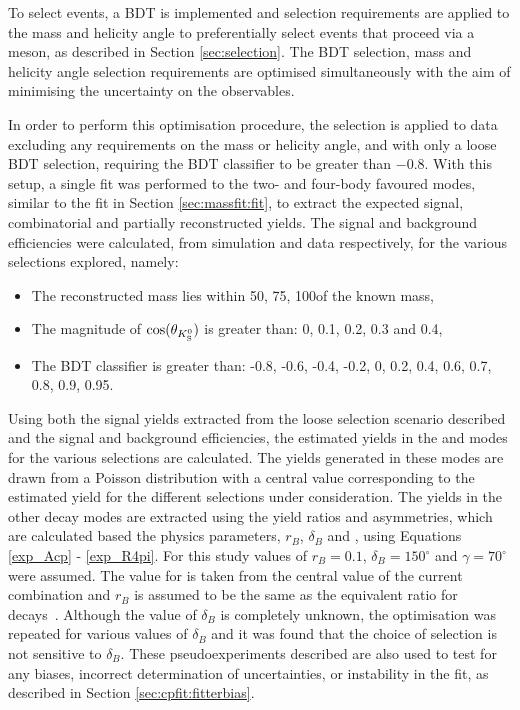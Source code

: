To select \btodkst events, a BDT is implemented and selection requirements are applied to the \Kstarm mass and \KS helicity angle to preferentially select events that proceed via a \Kstarm meson, as described in Section \ref{sec:selection}. The BDT selection, \Kstarm mass and \KS helicity angle selection requirements are optimised simultaneously with the aim of minimising the uncertainty on the \CP observables. 

In order to perform this optimisation procedure, the selection is applied to data excluding any requirements on the \Kstarm mass or \KS helicity angle, and with only a loose BDT selection, requiring the BDT classifier to be greater than $-0.8$. With this setup, a single fit was performed to the two- and four-body favoured modes, similar to the fit in Section \ref{sec:massfit:fit}, to extract the expected signal, combinatorial and partially reconstructed yields. The signal and background efficiencies were calculated, from simulation and data respectively, for the various selections explored, namely:

\begin{itemize}
\item{The reconstructed \Kstarm mass lies within 50\mevcc, 75\mevcc, 100\mevcc of the known \Kstarm mass,}
\item{The magnitude of $\cos(\theta_{{{K}^0_{\mathrm{ \scriptscriptstyle S}}}})$ is greater than: 0, 0.1, 0.2, 0.3 and 0.4,}
\item{The BDT classifier is greater than: -0.8, -0.6, -0.4, -0.2, 0, 0.2, 0.4, 0.6, 0.7, 0.8, 0.9, 0.95.}
\end{itemize}

Using both the signal yields extracted from the loose selection scenario described and the signal and background efficiencies, the estimated yields in the \kpi and \kpipipi modes for the various selections are calculated. The yields generated in these modes are drawn from a Poisson distribution with a central value corresponding to the estimated yield for the different selections under consideration. The yields in the other \Dz decay modes are extracted using the yield ratios and asymmetries, which are calculated based the physics parameters, $r_B$, $\delta_B$ and \Pgamma, using Equations \ref{exp_Acp} - \ref{exp_R4pi}. For this study values of $r_B = 0.1$, $\delta_B = 150^{\circ}$ and $\gamma = 70^{\circ}$ were assumed. The value for \Pgamma is taken from the central value of the current \lhcb combination and $r_B$ is assumed to be the same as the equivalent ratio for \decay{\Bm}{\D\Km} decays~\cite{LHCb-PAPER-2016-032}. Although the value of $\delta_B$ is completely unknown, the optimisation was repeated for various values of $\delta_B$ and it was found that the choice of selection is not sensitive to $\delta_B$.  These pseudoexperiments described are also used to test for any biases, incorrect determination of uncertainties, or instability in the \CP fit, as described in Section \ref{sec:cpfit:fitterbias}. 

